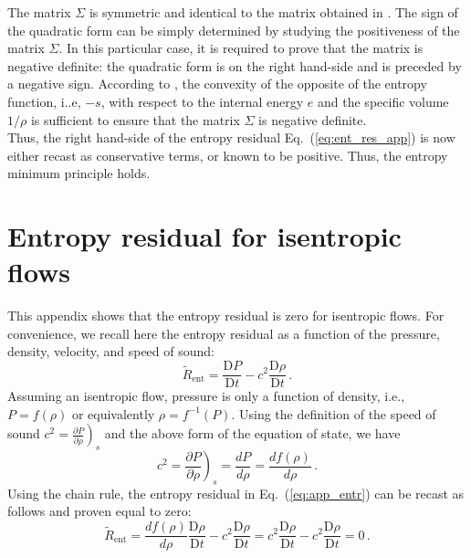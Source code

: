 \documentclass[review,10pt]{elsarticle}
\newcommand{\resinew}{\widetilde{R}_\text{ent}}
\newcommand{\matder}[1]{\frac{\textrm{D} #1}{\textrm{D} t}}
\newcommand{\eqt}[1]{Eq.~(\ref{#1})}                     %
\begin{document}
%
The matrix $\Sigma$ is symmetric and identical to the matrix obtained in \cite{jlg}. The sign of the quadratic form 
can be simply determined by studying the positiveness of the matrix $\Sigma$. In this particular case, it is required 
to prove that the matrix is negative definite: the quadratic form is on the right hand-side and is preceded by a negative 
sign. According to \cite{jlg}, the convexity of the opposite of the entropy function, i..e, $-s$, with respect to the internal energy $e$ 
and the specific volume $1/ \rho$ is sufficient to ensure that the matrix $\Sigma$ is negative definite. \\
Thus, the right hand-side of the entropy residual \eqt{eq:ent_res_app} is now either recast as conservative terms, 
or known to be positive. Thus, the entropy minimum principle holds.

\newpage
\section{Entropy residual for isentropic flows} \label{app:ise_equ}

This appendix shows that the entropy residual is zero for isentropic flows. For convenience, we recall
here the entropy residual as a function of the pressure, density, velocity, and speed of sound:
%
\begin{equation}\label{eq:app_entr}
\resinew = \matder P - c^2  \matder \rho \,.
\end{equation}
%
Assuming an isentropic flow, pressure is only a function of density, i.e., $P = f( \rho )$ or equivalently $\rho = f^{-1}( P )$. 
Using the definition of the speed of sound $c^2 = \left. \frac{\partial P}{\partial \rho} \right)_s$ and the above 
form of the equation of state, we have
%
\begin{equation}\label{eq:app_sp}
c^2 = \left. \frac{\partial P}{\partial \rho} \right)_s = \frac{d P}{d \rho} = \frac{d f(\rho)}{d \rho} \,.
\end{equation}
%
Using the chain rule, the entropy residual in \eqt{eq:app_entr} can be recast as follows and proven equal to zero:
%
\begin{equation}
\resinew = \frac{d f(\rho)}{d \rho}  \matder \rho - c^2  \matder  \rho  
         = c^2                       \matder \rho - c^2  \matder  \rho  
         =  0 \,.
\end{equation}

\end{document}
